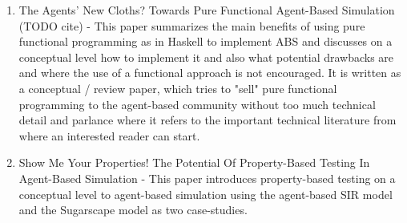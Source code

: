 \begin{enumerate}
	\item The Agents' New Cloths? Towards Pure Functional Agent-Based Simulation (TODO cite) - This paper summarizes the main benefits of using pure functional programming as in Haskell to implement ABS and discusses on a conceptual level how to implement it and also what potential drawbacks are and where the use of a functional approach is not encouraged. It is written as a conceptual / review paper, which tries to "sell" pure functional programming to the agent-based community without too much technical detail and parlance where it refers to the important technical literature from where an interested reader can start.
	
	\item Show Me Your Properties! The Potential Of Property-Based Testing In Agent-Based Simulation - This paper introduces property-based testing on a conceptual level to agent-based simulation using the agent-based SIR model and the Sugarscape model as two case-studies. 
\end{enumerate}
